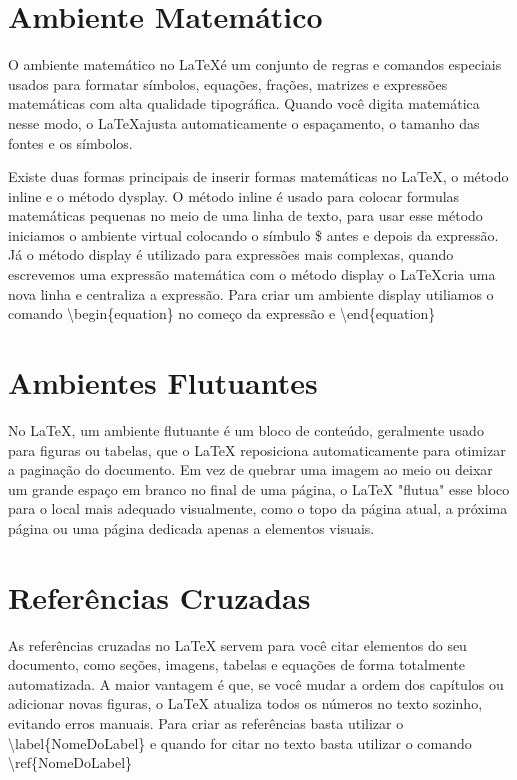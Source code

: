 \section{Ambiente Matemático}

O ambiente matemático no \LaTeX é um conjunto de regras e comandos especiais usados para formatar símbolos, equações, frações, matrizes e expressões matemáticas com alta qualidade tipográfica. Quando você digita matemática nesse modo, o \LaTeX ajusta automaticamente o espaçamento, o tamanho das fontes e os símbolos.

Existe duas formas principais de inserir formas matemáticas no \LaTeX, o método inline e o método dysplay. O método inline é usado para colocar formulas matemáticas pequenas no meio de uma linha de texto, para usar esse método iniciamos o ambiente virtual colocando o símbulo \$ antes e depois da expressão. Já o método display é utilizado para expressões mais complexas, quando escrevemos uma expressão matemática com o método display o \LaTeX cria uma nova linha e centraliza a expressão. Para criar um ambiente display utiliamos o comando \textbackslash begin\{equation\} no começo da expressão e \textbackslash end\{equation\} 


\section{Ambientes Flutuantes}

No LaTeX, um ambiente flutuante é um bloco de conteúdo, geralmente usado para figuras ou tabelas, que o LaTeX reposiciona automaticamente para otimizar a paginação do documento.
Em vez de quebrar uma imagem ao meio ou deixar um grande espaço em branco no final de uma página, o LaTeX "flutua" esse bloco para o local mais adequado visualmente, como o topo da página atual, a próxima página ou uma página dedicada apenas a elementos visuais.

\section{Referências Cruzadas}

As referências cruzadas no LaTeX servem para você citar elementos do seu documento, como seções, imagens, tabelas e equações de forma totalmente automatizada. A maior vantagem é que, se você mudar a ordem dos capítulos ou adicionar novas figuras, o LaTeX atualiza todos os números no texto sozinho, evitando erros manuais. Para criar as referências basta utilizar o \textbackslash label\{NomeDoLabel\} e quando for citar no texto basta utilizar o comando \textbackslash ref\{NomeDoLabel\}

